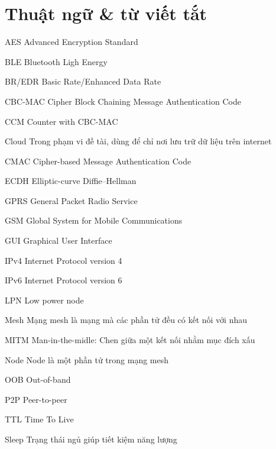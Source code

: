 \newcommand{\abbrlabel}[1]{\makebox[3cm][l]{\textbf{#1}\ \dotfill}}
\newenvironment{abbreviations}{\begin{list}{}{\renewcommand{\makelabel}{\abbrlabel}}}{\end{list}}

\chapter*{Thuật ngữ \& từ viết tắt}
\thispagestyle{empty}
\pagestyle{empty}
\vspace{1.0cm}
\begin{abbreviations}
	\item[AES] Advanced Encryption Standard 
	\item[BLE] Bluetooth Ligh Energy
	\item[BR/EDR] Basic Rate/Enhanced Data Rate 
	\item[CBC-MAC] Cipher Block Chaining Message Authentication Code
	\item[CCM] Counter with CBC-MAC
	\item[Cloud] Trong phạm vi đề tài, dùng để chỉ nơi lưu trữ dữ liệu trên internet
	\item[CMAC] Cipher-based Message Authentication Code
	\item[ECDH] Elliptic-curve Diffie–Hellman
	\item[GPRS] General Packet Radio Service
	\item[GSM] Global System for Mobile Communications
	\item[GUI] Graphical User Interface
	\item[IPv4] Internet Protocol version 4
	\item[IPv6] Internet Protocol version 6
	\item[LPN]  Low power node
	\item[Mesh] Mạng mesh là mạng mà các phần tử đều có kết nối với nhau
	\item[MITM] Man-in-the-midle: Chen giữa một kết nối nhằm mục đích xấu
	\item[Node] Node là một phần tử trong mạng mesh
	\item[OOB] Out-of-band
	\item[P2P] Peer-to-peer
	\item[TTL] Time To Live
	\item[Sleep] Trạng thái ngủ giúp tiết kiệm năng lượng
\end{abbreviations}